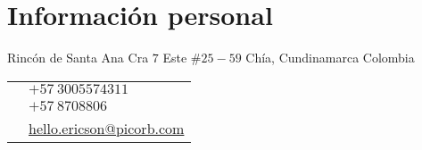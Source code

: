 
\section{Informaci\'on personal}
%
%
%
\begin{minipage}[t]{\textwidth-\rcollength-0.5cm}
Rinc\'{o}n de Santa Ana\newline
Cra $7$ Este $\# 25-59$\newline
Ch\'{i}a, Cundinamarca Colombia
\end{minipage}
\begin{minipage}[t]{\rcollength-0.5cm}
\colorbox{shade}{\textcolor{text1}{ 
\begin{tabular}[t]{c|l}%
\raisebox{-3pt}{\PhoneHandset} 
& $+57\:3005574311$ \\
\raisebox{-3pt}{\Phone} 
& $+57\:8708806$ \\
\raisebox{-3pt}{\Envelope}
& 
\href{mailto:hello.ericson@picorb.com}{hello.ericson@picorb.com}\\
\end{tabular}
}}%
\end{minipage}

